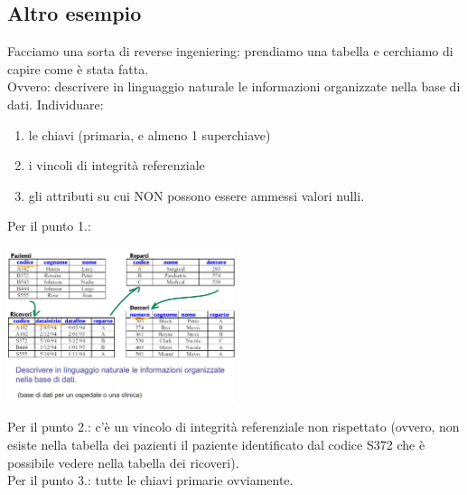 \subsection{Altro esempio}
Facciamo una sorta di reverse ingeniering: prendiamo una tabella e cerchiamo di capire come è stata fatta.
\\Ovvero: descrivere in linguaggio naturale le informazioni organizzate nella base di dati. 
Individuare: 
\begin{enumerate}
    \item le chiavi (primaria, e almeno 1 superchiave)
    \item i vincoli di integrità referenziale
    \item gli attributi su cui NON possono essere ammessi valori nulli.
\end{enumerate} 
Per il punto 1.:
\begin{center}
    \includegraphics[width=0.5\textwidth]{chaptersLezioniSara/img/MR_es_altro1.jpg}
\end{center}
Per il punto 2.: c'è un vincolo di integrità referenziale non rispettato (ovvero, non esiste nella tabella dei pazienti il paziente identificato dal codice S372 che è possibile vedere nella tabella dei ricoveri).
\\Per il punto 3.: tutte le chiavi primarie ovviamente.

